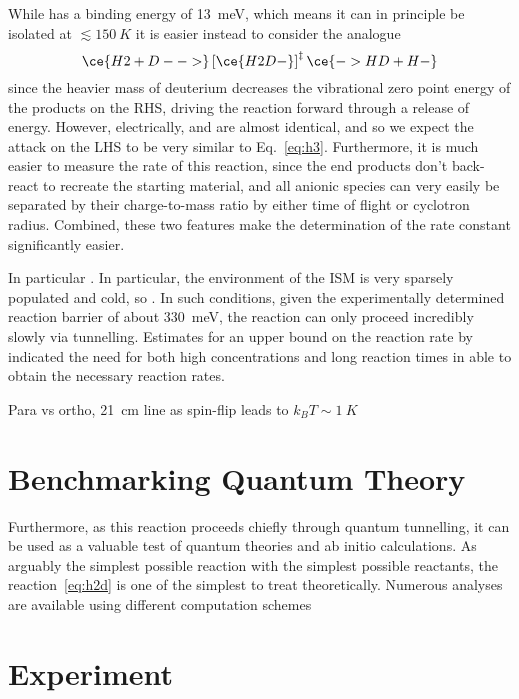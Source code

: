 \documentclass[12pt]{article}
\begin{document}
While  has a binding energy of \SI{13}{meV}, which means it can in principle be isolated at \( \lesssim\SI{150}{K} \) it is easier instead to consider the analogue
\begin{equation}
    \ce{H2 + D- ->} \left[\ce{H2D-} \right]^\ddagger \ce{-> HD + H- } \label{eq:h2d}
\end{equation}
since the heavier mass of deuterium decreases the vibrational zero point energy of the products on the RHS, driving the reaction forward through a release of energy. However, electrically,  and  are almost identical, and so we expect the attack on the LHS to be very similar to Eq.~\ref{eq:h3}. Furthermore, it is much easier to measure the rate of this reaction, since the end products don't back-react to recreate the starting material, and all anionic species can very easily be separated by their charge-to-mass ratio by either time of flight or cyclotron radius. Combined, these two features make the determination of the rate constant significantly easier.

In particular . In particular, the environment of the ISM is very sparsely populated and cold, so . In such conditions, given the experimentally determined reaction barrier of about \SI{330}{meV}\cite{zimmer_crossed-beam_1995}, the reaction can only proceed incredibly slowly via tunnelling. Estimates for an upper bound on the reaction rate by~\cite{endres_upper_2017} indicated the need for both high concentrations and long reaction times in able to obtain the necessary reaction rates.

Para vs ortho, \SI{21}{cm} line as spin-flip leads to \( k_BT\sim \SI{1}{K} \)\cite{krumholz_notes_2016}

\section{Benchmarking Quantum Theory}
Furthermore, as this reaction proceeds chiefly through quantum tunnelling, it can be used as a valuable test of quantum theories and ab initio calculations. As arguably the simplest possible reaction with the simplest possible reactants, the reaction~\ref{eq:h2d} is one of the simplest to treat theoretically. Numerous analyses are available using different computation schemes

\section{Experiment}
\end{document}
